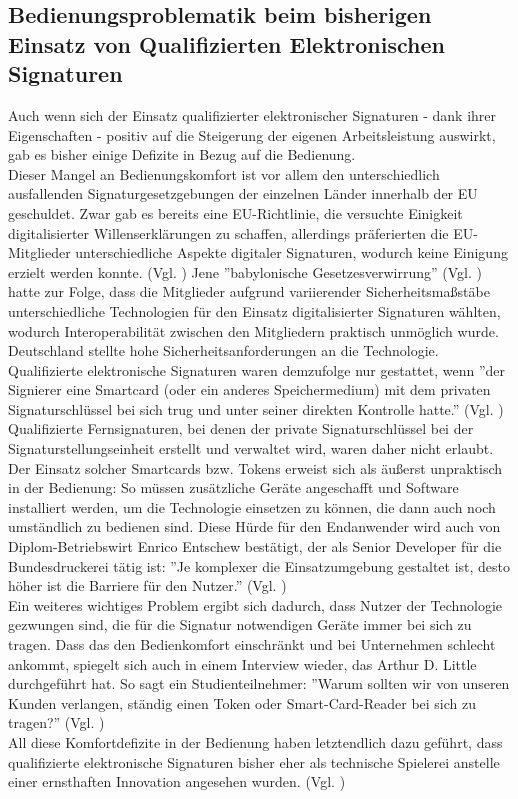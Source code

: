 \documentclass[deutsch]{lib/llncs/llncs}
\begin{document}
\subsection{Bedienungsproblematik beim bisherigen Einsatz von Qualifizierten Elektronischen Signaturen}
Auch wenn sich der Einsatz qualifizierter elektronischer Signaturen - dank ihrer Eigenschaften - positiv auf die Steigerung der eigenen Arbeitsleistung auswirkt, gab es bisher einige Defizite in Bezug auf die Bedienung. \\
Dieser Mangel an Bedienungskomfort ist vor allem den unterschiedlich ausfallenden Signaturgesetzgebungen der einzelnen Länder innerhalb der EU geschuldet. Zwar gab es bereits eine EU-Richtlinie, die versuchte Einigkeit digitalisierter Willenserklärungen zu schaffen, allerdings präferierten die EU-Mitglieder unterschiedliche Aspekte digitaler Signaturen, wodurch keine Einigung erzielt werden konnte. (Vgl. \cite[S. 30]{Zitat08}) Jene ''babylonische Gesetzesverwirrung'' (Vgl. \cite[S. 30]{Zitat08}) hatte zur Folge, dass die Mitglieder aufgrund variierender Sicherheitsmaßstäbe unterschiedliche Technologien für den Einsatz digitalisierter Signaturen wählten, wodurch Interoperabilität zwischen den Mitgliedern praktisch unmöglich wurde. \\
Deutschland stellte hohe Sicherheitsanforderungen an die Technologie. Qualifizierte elektronische Signaturen waren demzufolge nur gestattet, wenn ''der Signierer eine Smartcard (oder ein anderes Speichermedium) mit dem privaten Signaturschlüssel bei sich trug und unter seiner direkten Kontrolle hatte.'' (Vgl. \cite[S. 30]{Zitat08}) Qualifizierte Fernsignaturen, bei denen der private Signaturschlüssel bei der Signaturstellungseinheit erstellt und verwaltet wird, waren daher nicht erlaubt. \\
Der Einsatz solcher Smartcards bzw. Tokens erweist sich als äußerst unpraktisch in der Bedienung: So müssen zusätzliche Geräte angeschafft und Software installiert werden, um die Technologie einsetzen zu können, die dann auch noch umständlich zu bedienen sind. Diese Hürde für den Endanwender wird auch von Diplom-Betriebswirt Enrico Entschew bestätigt, der als Senior Developer für die Bundesdruckerei tätig ist: ''Je komplexer die Einsatzumgebung gestaltet ist, desto höher ist die Barriere für den Nutzer.'' (Vgl. \cite[S. 232]{Zitat09}) \\
Ein weiteres wichtiges Problem ergibt sich dadurch, dass Nutzer der Technologie gezwungen sind, die für die Signatur notwendigen Geräte immer bei sich zu tragen. Dass das den Bedienkomfort einschränkt und bei Unternehmen schlecht ankommt, spiegelt sich auch in einem Interview wieder, das Arthur D. Little durchgeführt hat. So sagt ein Studienteilnehmer: ''Warum sollten wir von unseren Kunden verlangen, ständig einen Token oder Smart-Card-Reader bei sich zu tragen?'' (Vgl. \cite[S. 5]{Zitat05}) \\
All diese Komfortdefizite in der Bedienung haben letztendlich dazu geführt, dass qualifizierte elektronische Signaturen bisher eher als technische Spielerei anstelle einer ernsthaften Innovation angesehen wurden.  (Vgl. \cite[S. 29]{Zitat08})
\end{document}

